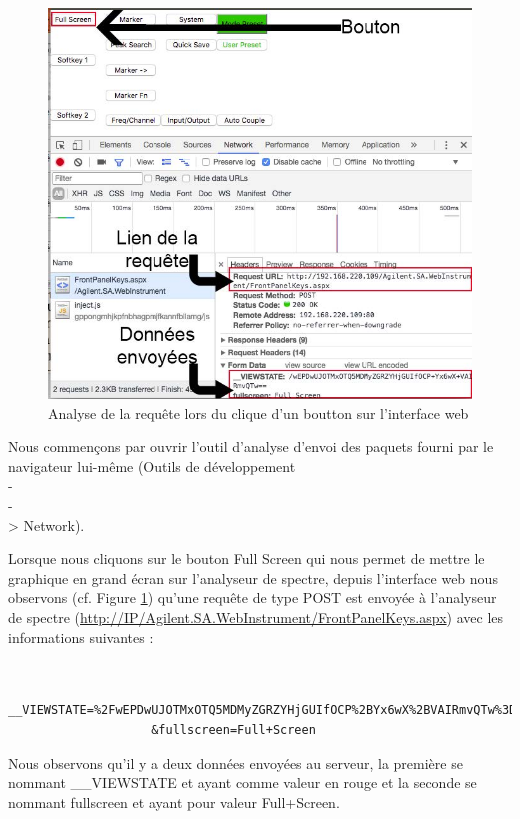             \begin{figure}[ht]
                \centering
                \includegraphics[width=0.5\linewidth]{images/spa/AS_web_click_button}
                \caption{Analyse de la requête lors du clique d'un boutton sur l'interface web}
                \label{fig:AS_web_click_button}
            \end{figure}

        Nous commençons par ouvrir l'outil d'analyse d'envoi des paquets fourni par le navigateur lui-même
        (Outils de développement \\-\\-\\> Network).

        Lorsque nous cliquons sur le bouton  Full Screen  qui nous permet de mettre le graphique en grand
            écran sur l'analyseur de spectre, depuis l'interface web nous observons (cf. Figure \ref{fig:AS_web_click_button})
            qu'une requête de type POST est envoyée à l'analyseur de spectre
            (\url{http://IP/Agilent.SA.WebInstrument/FrontPanelKeys.aspx}) avec les informations suivantes :

        \begin{lstlisting}[frame=single]  % Start your code-block

         __VIEWSTATE=%2FwEPDwUJOTMxOTQ5MDMyZGRZYHjGUIfOCP%2BYx6wX%2BVAIRmvQTw%3D%3D
                    &fullscreen=Full+Screen
        \end{lstlisting}

        Nous observons qu'il y a deux données envoyées au serveur, la première se nommant \_\_VIEWSTATE et ayant comme
            valeur en rouge et la seconde se nommant  fullscreen  et ayant pour valeur Full+Screen.


